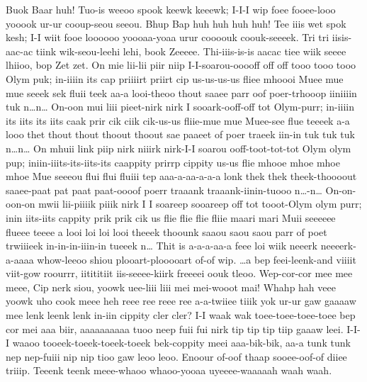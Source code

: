 \documentclass[12pt,a4paper]{article}
\begin{document}
\begin{drama}
\parrspeaks
Buok Baar huh! Tuo-is weeoo spook keewk keeewk; I-I-I wip foee fooee-looo yooook ur-ur cooup-seou seeou. Bhup Bap huh huh huh huh! Tee iiis wet spok kesh; I-I wiit fooe loooooo yoooaa-yoaa urur coooouk coouk-seeeek.
\pistspeaks
Tri tri iisis-aac-ac tiink wik-seou-leehi lehi, book Zeeeee. Thi-iiis-is-is aacac tiee wiik seeee lhiioo, bop Zet zet.
\cinespeaks
On mie lii-lii piir niip I-I-soarou-ooooff off off tooo tooo tooo Olym puk; in-iiiin its cap priiiirt priirt cip us-us-us-us fliee mhoooi Muee mue mue seeek sek fluii teek aa-a looi-theoo thout saaee parr oof poer-trhooop iiniiiin tuk n…n… On-oon mui liii pieet-nirk nirk I sooark-ooff-off tot Olym-purr; in-iiiin its iits its iits caak prir cik ciik cik-us-us fliie-mue mue Muee-see flue teeeek a-a looo thet thout thout thoout thoout sae paaeet of poer traeek iin-in tuk tuk tuk n…n… On mhuii link piip nirk niiirk nirk-I-I soarou ooff-toot-tot-tot Olym olym pup; iniin-iiits-its-iits-its caappity prirrp cippity us-us flie mhooe mhoe mhoe mhoe Mue seeeou flui flui fluiii tep aaa-a-aa-a-a-a lonk thek thek theek-thoooout saaee-paat pat paat paat-oooof poerr traaank traaank-iinin-tuooo n…-n… On-on-oon-on mwii lii-piiiik piiik nirk I I soareep sooareep off tot tooot-Olym olym purr; inin iits-iits cappity prik prik cik us flie flie flie fliie maari mari Muii seeeeee flueee teeee a looi loi loi looi theeek thoounk saaou saou saou parr of poet trwiiieek in-in-in-iiin-in tueeek n…
\pistspeaks
Thit is a-a-a-aa-a feee loi wiik neeerk neeeerk-a-aaaa whow-leeoo shiou plooart-plooooart of-of wip.
\cinespeaks
  …a bep feei-leenk-and viiiit viit-gow roourrr, iitititiit iis-seeee-kiirk freeeei oouk tleoo.
\pistspeaks
Wep-cor-cor mee mee meee, Cip nerk siou, yoowk uee-liii liii mei mei-wooot mai! Whahp hah veee yoowk uho cook meee heh reee ree reee ree a-a-twiiee tiiik yok ur-ur gaw gaaaaw mee lenk leenk lenk in-iin cippity cler cler?
\cinespeaks
I-I waak wak toee-toee-toee-toee bep cor mei aaa biir, aaaaaaaaaa tuoo neep fuii fui nirk tip tip tip tiip gaaaw leei. I-I-I waaoo tooeek-toeek-toeek-toeek bek-coppity meei aaa-bik-bik, aa-a tunk tunk nep nep-fuiii nip nip tioo gaw leoo leoo.
\pistspeaks
Enoour of-oof thaap sooee-oof-of diiee triiip. Teeenk teenk meee-whaoo whaoo-yooaa uyeeee-waaaaah waah waah.
\cinespeaks

\end{drama}
\end{document}

